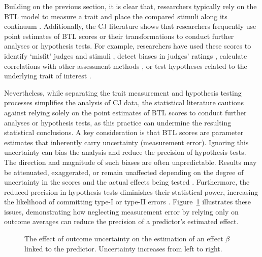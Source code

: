 \documentclass[
  authoryear,
  review,
  1p]{elsarticle}
\begin{document}
Building on the previous section, it is clear that, researchers
typically rely on the BTL model to measure a trait and place the
compared stimuli along its continuum \citep[pp.~269]{Thurstone_1927b}.
Additionally, the CJ literature shows that researchers frequently use
point estimates of BTL scores or their transformations to conduct
further analyses or hypothesis tests. For example, researchers have used
these scores to identify `misfit' judges and stimuli
\citep{Pollitt_2012b, vanDaal_et_al_2016, Goossens_et_al_2018}, detect
biases in judges' ratings \citep{Pollitt_et_al_2003, Pollitt_2012b},
calculate correlations with other assessment methods
\citep{Goossens_et_al_2018, Bouwer_et_al_2023}, or test hypotheses
related to the underlying trait of interest
\citep{Casalicchio_et_al_2015, Bramley_et_al_2019, Boonen_et_al_2020, Bouwer_et_al_2023, vanDaal_et_al_2017, Jones_et_al_2019, Gijsen_et_al_2021}.

Nevertheless, while separating the trait measurement and hypothesis
testing processes simplifies the analysis of CJ data, the statistical
literature cautions against relying solely on the point estimates of BTL
scores to conduct further analyses or hypothesis tests, as this practice
can undermine the resulting statistical conclusions. A key consideration
is that BTL scores are parameter estimates that inherently carry
uncertainty (measurement error). Ignoring this uncertainty can bias the
analysis and reduce the precision of hypothesis tests. The direction and
magnitude of such biases are often unpredictable. Results may be
attenuated, exaggerated, or remain unaffected depending on the degree of
uncertainty in the scores and the actual effects being tested
\citetext{\citealp[pp.~25]{Kline_et_al_2023}; \citealp[pp.~137]{Hoyle_et_al_2023}}.
Furthermore, the reduced precision in hypothesis tests diminishes their
statistical power, increasing the likelihood of committing type-I or
type-II errors \citep{McElreath_2020}.
Figure~\ref{fig-measurement_error} illustrates these issues,
demonstrating how neglecting measurement error by relying only on
outcome averages can reduce the precision of a predictor's estimated
effect.

\begin{figure}


\caption{\label{fig-measurement_error}The effect of outcome uncertainty
on the estimation of an effect \(\beta\) linked to the predictor.
Uncertainty increases from left to right.}

\end{figure}%
\end{document}
